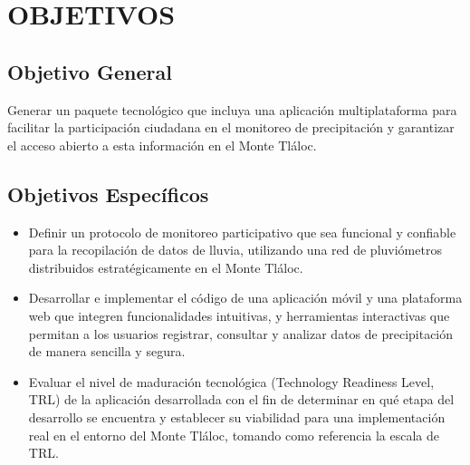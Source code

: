 \chapter{OBJETIVOS}
\section{Objetivo General}

Generar un paquete tecnológico que incluya una aplicación multiplataforma para facilitar la participación ciudadana en el monitoreo de precipitación y garantizar el acceso abierto a esta información en el Monte Tláloc.

\section{Objetivos Específicos}

\begin{itemize}
    \item Definir un protocolo de monitoreo participativo que sea funcional y confiable para la recopilación de datos de lluvia, utilizando una red de pluviómetros distribuidos estratégicamente en el Monte Tláloc.
    \item Desarrollar e implementar el código de una aplicación móvil y una plataforma web que integren funcionalidades intuitivas, y herramientas interactivas que permitan a los usuarios registrar, consultar y analizar datos de precipitación de
    manera sencilla y segura.
    \item Evaluar el nivel de maduración tecnológica (Technology Readiness Level, TRL) de la aplicación desarrollada con el fin de determinar en qué etapa del desarrollo se encuentra y establecer su viabilidad para una implementación real en el entorno del Monte Tláloc, tomando como referencia la escala de TRL.
\end{itemize}